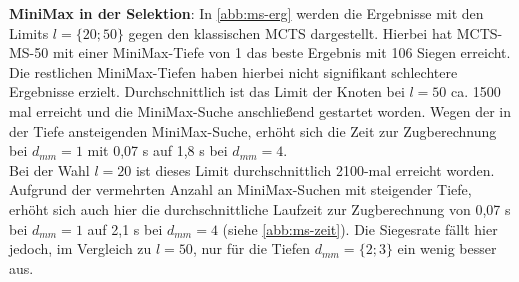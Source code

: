 \documentclass[12pt,a4paper,bibliography=totocnumbered,listof=totocnumbered]{article}
\begin{document}
\textbf{MiniMax in der Selektion}: 
In \autoref{abb:ms-erg} werden die Ergebnisse mit den Limits $l=\{20;50\}$ gegen den klassischen MCTS dargestellt. Hierbei hat MCTS-MS-50 mit einer MiniMax-Tiefe von 1 das beste Ergebnis mit 106 Siegen erreicht. Die restlichen MiniMax-Tiefen haben hierbei nicht signifikant schlechtere Ergebnisse erzielt. Durchschnittlich ist das Limit der Knoten bei $l=50$ ca. 1500 mal erreicht und die MiniMax-Suche anschließend gestartet worden. Wegen der in der Tiefe ansteigenden MiniMax-Suche, erhöht sich die Zeit zur Zugberechnung bei $d_{mm}=1$ mit 0,07 s auf 1,8 s bei $d_{mm}=4$.\\
Bei der Wahl $l=20$ ist dieses Limit durchschnittlich 2100-mal erreicht worden. Aufgrund der vermehrten Anzahl an MiniMax-Suchen mit steigender Tiefe, erhöht sich auch hier die durchschnittliche Laufzeit zur Zugberechnung von 0,07 s bei $d_{mm}=1$ auf 2,1 s bei $d_{mm}=4$ (siehe \autoref{abb:ms-zeit}). Die Siegesrate fällt hier jedoch, im Vergleich zu $l=50$, nur für die Tiefen $d_{mm} = \{2;3\}$ ein wenig besser aus.\\
\end{document}
